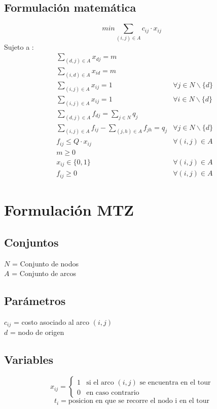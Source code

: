 \documentclass{article}
\numberwithin{equation}{section}
\begin{document}
\subsection{Formulación matemática}
\begin{equation}
min \sum_{(i,j) \in A} c_{ij} \cdot x_{ij}
\end{equation}
Sujeto a : \begin{align}
& \sum_{(d,j) \in A} x_{dj} = m \\
& \sum_{(i,d) \in A} x_{id} = m \\
& \sum_{(i,j) \in A} x_{ij} = 1 &\forall j \in N\backslash \{d\} \\
& \sum_{(i,j) \in A} x_{ij} = 1 &\forall i \in N\backslash \{d\} \\
& \sum_{(d,j) \in A} f_{dj} = \sum_{j \in N} q_{j} \\
& \sum_{(i,j) \in A} f_{ij} - \sum_{(j,h) \in A} f_{jh} = q_{j} &\forall j \in N \backslash \{d\} \\
& f_{ij} \leq Q \cdot  x_{ij} & \forall (i,j) \in A\\
& m \geq 0\\
& x_{ij} \in \{0,1\} &\forall (i,j) \in A\\
& f_{ij} \geq 0 &\forall (i,j) \in A
\end{align}

\newpage
\section{Formulación MTZ}
\subsection{Conjuntos}
$N$ = Conjunto de nodos\\
$A$ = Conjunto de arcos
\subsection{Parámetros}
$c_{ij}$ = costo asociado al arco $(i,j)$\\
$d$ = nodo de origen
\subsection{Variables}
\begin{flushleft}
\[x_{ij}={\begin{cases}1&{\mbox{si el arco $(i,j)$ se encuentra en el tour}}\\0&{\mbox{en caso contrario}}\end{cases}}
\]
\[t_{i} = \mbox{posicion en que se recorre el nodo i en el tour}\]
\end{flushleft}
\end{document}
